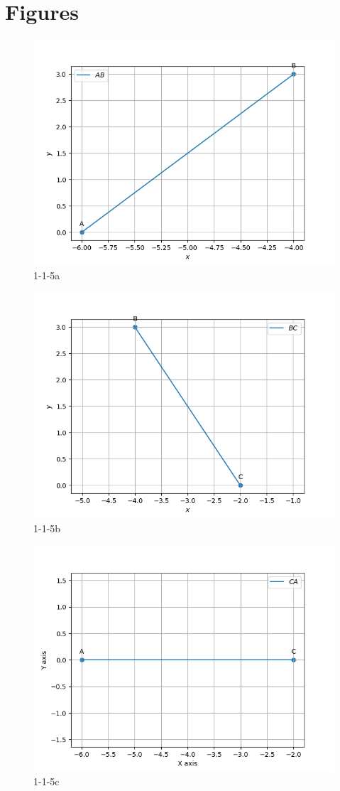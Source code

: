 \documentclass[journal,12pt,onecolumn]{IEEEtran}
\theoremstyle{remark}
\begin{document}
%

\section{Figures}
\begin{figure}[!ht]
	\centering
	\includegraphics[width=0.5\columnwidth]{figs/1-1-5a.png}
	\caption{1-1-5a}
	\label{fig33:Triangle_with_centroid}	
\end{figure}
\begin{figure}[!ht]
	\centering
	\includegraphics[width=0.5\columnwidth]{figs/1-1-5b.png}
	\caption{1-1-5b}
	\label{fig33:Triangle_with_centroid}	
\end{figure}
\begin{figure}[!ht]
	\centering
	\includegraphics[width=0.5\columnwidth]{figs/1-1-5c.png}
	\caption{1-1-5c}
	\label{fig33:Triangle_with_centroid}	
\end{figure}
\end{document}
